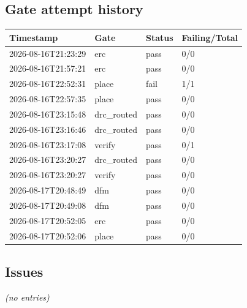 \documentclass[11pt,a4paper]{article}
\begin{document}
\subsection*{Gate attempt history}
{\small
\begin{longtable}{llll}
\toprule
\textbf{Timestamp} & \textbf{Gate} & \textbf{Status} & \textbf{Failing/Total} \\
\midrule
\endhead
2026-08-16T21:23:29 & erc & pass & 0/0 \\
2026-08-16T21:57:21 & erc & pass & 0/0 \\
2026-08-16T22:52:31 & place & fail & 1/1 \\
2026-08-16T22:57:35 & place & pass & 0/0 \\
2026-08-16T23:15:48 & drc\_routed & pass & 0/0 \\
2026-08-16T23:16:46 & drc\_routed & pass & 0/0 \\
2026-08-16T23:17:08 & verify & pass & 0/1 \\
2026-08-16T23:20:27 & drc\_routed & pass & 0/0 \\
2026-08-16T23:20:27 & verify & pass & 0/0 \\
2026-08-17T20:48:49 & dfm & pass & 0/0 \\
2026-08-17T20:49:08 & dfm & pass & 0/0 \\
2026-08-17T20:52:05 & erc & pass & 0/0 \\
2026-08-17T20:52:06 & place & pass & 0/0 \\
\bottomrule
\end{longtable}
}
\subsection*{Issues}
\emph{(no entries)}
\end{document}
